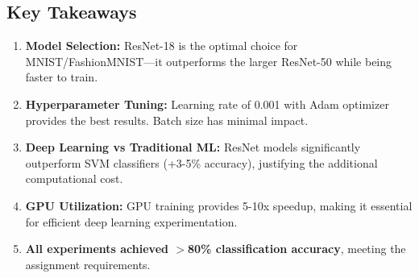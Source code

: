 \documentclass[11pt,a4paper]{article}
\begin{document}
\subsection{Key Takeaways}

\begin{enumerate}
    \item \textbf{Model Selection:} ResNet-18 is the optimal choice for MNIST/FashionMNIST—it outperforms the larger ResNet-50 while being faster to train.
    
    \item \textbf{Hyperparameter Tuning:} Learning rate of 0.001 with Adam optimizer provides the best results. Batch size has minimal impact.
    
    \item \textbf{Deep Learning vs Traditional ML:} ResNet models significantly outperform SVM classifiers (+3-5\% accuracy), justifying the additional computational cost.
    
    \item \textbf{GPU Utilization:} GPU training provides 5-10x speedup, making it essential for efficient deep learning experimentation.
    
    \item \textbf{All experiments achieved $>$80\% classification accuracy}, meeting the assignment requirements.
\end{enumerate}
\end{document}

